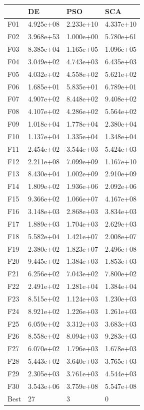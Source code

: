 \begin{tabular}{llll}
\toprule
{} &         DE &        PSO &        SCA \\
\midrule
F01  &  4.925e+08 &  2.233e+10 &  4.337e+10 \\
F02  &  3.968e+53 &  1.000e+00 &  5.780e+61 \\
F03  &  8.385e+04 &  1.165e+05 &  1.096e+05 \\
F04  &  3.049e+02 &  4.743e+03 &  6.435e+03 \\
F05  &  4.032e+02 &  4.558e+02 &  5.621e+02 \\
F06  &  1.685e+01 &  5.835e+01 &  6.789e+01 \\
F07  &  4.907e+02 &  8.448e+02 &  9.408e+02 \\
F08  &  4.107e+02 &  4.286e+02 &  5.564e+02 \\
F09  &  1.018e+04 &  1.778e+04 &  2.380e+04 \\
F10  &  1.137e+04 &  1.335e+04 &  1.348e+04 \\
F11  &  2.454e+02 &  3.544e+03 &  5.424e+03 \\
F12  &  2.211e+08 &  7.099e+09 &  1.167e+10 \\
F13  &  8.430e+04 &  1.002e+09 &  2.910e+09 \\
F14  &  1.809e+02 &  1.936e+06 &  2.092e+06 \\
F15  &  9.366e+02 &  1.066e+07 &  4.167e+08 \\
F16  &  3.148e+03 &  2.868e+03 &  3.834e+03 \\
F17  &  1.889e+03 &  1.704e+03 &  2.629e+03 \\
F18  &  5.582e+04 &  1.421e+07 &  2.008e+07 \\
F19  &  2.380e+02 &  1.823e+07 &  2.496e+08 \\
F20  &  9.445e+02 &  1.384e+03 &  1.853e+03 \\
F21  &  6.256e+02 &  7.043e+02 &  7.800e+02 \\
F22  &  2.491e+02 &  1.281e+04 &  1.384e+04 \\
F23  &  8.515e+02 &  1.124e+03 &  1.230e+03 \\
F24  &  8.921e+02 &  1.226e+03 &  1.261e+03 \\
F25  &  6.059e+02 &  3.312e+03 &  3.683e+03 \\
F26  &  8.558e+02 &  8.094e+03 &  9.283e+03 \\
F27  &  6.070e+02 &  1.796e+03 &  1.678e+03 \\
F28  &  5.443e+02 &  3.640e+03 &  3.765e+03 \\
F29  &  2.305e+03 &  3.761e+03 &  4.544e+03 \\
F30  &  3.543e+06 &  3.759e+08 &  5.547e+08 \\
Best &         27 &          3 &          0 \\
\bottomrule
\end{tabular}
